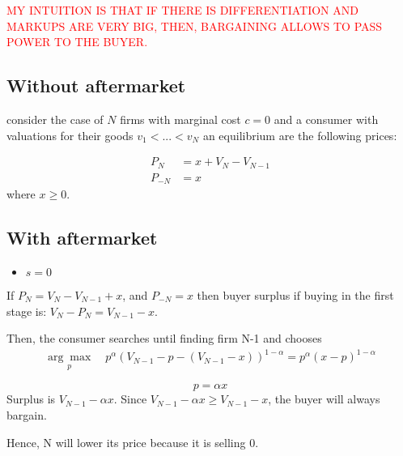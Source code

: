 \documentclass[12pt]{article}
\theoremstyle{plain}
\theoremstyle{plain}
\begin{document}
\textcolor{red}{MY INTUITION IS THAT IF THERE IS DIFFERENTIATION AND MARKUPS ARE VERY BIG, THEN, BARGAINING ALLOWS TO PASS POWER TO THE BUYER. }


\vspace{3cm}

\subsection*{Without aftermarket}
 
consider the  case of $N$ firms with marginal cost $c = 0$  and a consumer with valuations for their goods $v_1 < ... < v_N$ an equilibrium are the following prices: 
     
\begin{align*}
    P_N &= x + V_N - V_{N-1}\\
    P_{-N} &= x  
\end{align*}
where $x \geq 0$. 

 
 

\subsection*{With aftermarket}
\begin{itemize}
    \item $s=0$
\end{itemize}
If $P_N = V_N - V_{N-1} + x$, and $P_{-N} = x$ then buyer surplus if buying in the first stage is:  $V_N - P_N = V_{N-1} - x$.

Then, the consumer searches until finding firm N-1 and chooses
\begin{align*}
    \underset{p}{\arg \max} \quad  p^\alpha(V_{N-1} - p - ( V_{N-1} - x) ) ^{1-\alpha}= p^\alpha(x-p) ^{1-\alpha}
\end{align*}
 
\[ p = \alpha x \]
Surplus is $V_{N-1} - \alpha x$. Since $V_{N-1} - \alpha x \geq V_{N-1} - x$, the buyer will always bargain.

\vspace{1cm}
Hence, N will lower its price because it is selling 0.
\end{document}
